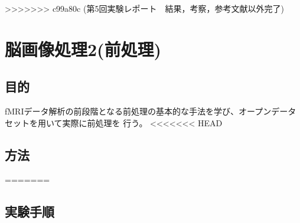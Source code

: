 \documentclass{jlreq}
\begin{document}
>>>>>>> c99a80c (第5回実験レポート　結果，考察，参考文献以外完了)
\section{脳画像処理2(前処理)}
\subsection{目的}
fMRIデータ解析の前段階となる前処理の基本的な手法を学び、オープンデータセットを用いて実際に前処理を
行う。
<<<<<<< HEAD
\subsection{方法}

=======
\subsection{実験手順}
\end{document}
